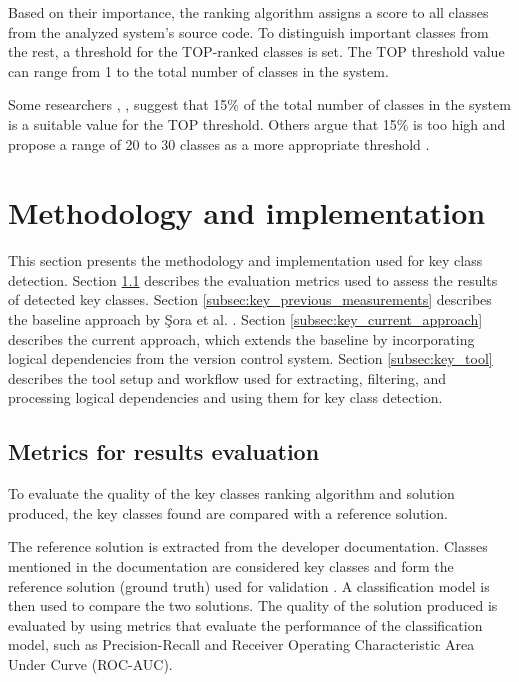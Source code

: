 Based on their importance, the ranking algorithm assigns a score to all classes from the analyzed system's source code. To distinguish important classes from the rest, a threshold for the TOP-ranked classes is set. The TOP threshold value can range from 1 to the total number of classes in the system. 

Some researchers \cite{ZaidmanJurnal}, \cite{Ding2016AnIA}, \cite{PAN2018188} suggest that 15\% of the total number of classes in the system is a suitable value for the TOP threshold. Others \cite{Finding-key-classes} argue that 15\% is too high and propose a range of 20 to 30 classes as a more appropriate threshold \cite{b4}.

\section{Methodology and implementation}
\label{sec:key_methodology_implementation}

\hspace{4em}This section presents the methodology and implementation used for key class detection. Section \ref{subsec:key_evalmetrics} describes the evaluation metrics used to assess the results of detected key classes. Section \ref{subsec:key_previous_measurements} describes the baseline approach by Şora et al. \cite{Finding-key-classes}. Section \ref{subsec:key_current_approach} describes the current approach, which extends the baseline by incorporating logical dependencies from the version control system. Section \ref{subsec:key_tool} describes the tool setup and workflow used for extracting, filtering, and processing logical dependencies and using them for key class detection.


\subsection{Metrics for results evaluation} %
\label{subsec:key_evalmetrics}

\hspace{4em}To evaluate the quality of the key classes ranking algorithm and solution produced, the key classes found are compared with a reference solution.

The reference solution is extracted from the developer documentation. Classes mentioned in the documentation are considered key classes and form the reference solution (ground truth) used for validation \cite{7551990}. A classification model is then used to compare the two solutions. The quality of the solution produced is evaluated by using metrics that evaluate the performance of the classification model, such as Precision-Recall and Receiver Operating Characteristic Area Under Curve (ROC-AUC). 


